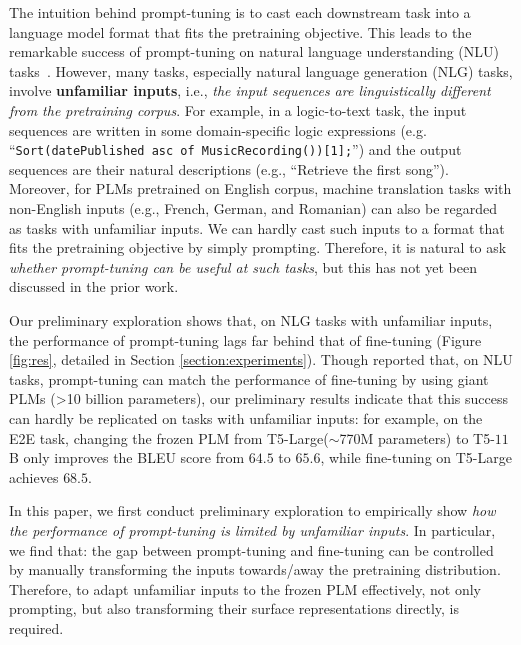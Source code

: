 The intuition behind prompt-tuning is to cast each downstream task into a language model format that fits the pretraining objective. This leads to the remarkable success of prompt-tuning on natural language understanding (NLU) tasks~\citep{liu2021gpt,lester2021power}. However, many tasks, especially natural language generation (NLG) tasks, involve \textbf{unfamiliar inputs}, i.e., \emph{the input sequences are linguistically different from the pretraining corpus}. For example, in a logic-to-text task, the input sequences are written in some domain-specific logic expressions (e.g. ``\texttt{\small Sort(datePublished asc of MusicRecording())[1];}'') and the output sequences are their natural descriptions (e.g., ``Retrieve the first song''). Moreover, for PLMs pretrained on English corpus, machine translation tasks with non-English inputs (e.g., French, German, and Romanian) can also be regarded as tasks with unfamiliar inputs. We can hardly cast such inputs to a format that fits the pretraining objective by simply prompting. Therefore, it is natural to ask \emph{whether prompt-tuning can be useful at such tasks}, but this has not yet been discussed in the prior work.

Our preliminary exploration shows that, on NLG tasks with unfamiliar inputs, the performance of prompt-tuning lags far behind that of fine-tuning (Figure \ref{fig:res}, detailed in Section \ref{section:experiments}).
Though \citet{lester2021power} reported that, on NLU tasks, prompt-tuning can match the performance of fine-tuning by using giant PLMs (\textgreater{10} billion parameters), our preliminary results indicate that this success can hardly be replicated on tasks with unfamiliar inputs: for example, on the E2E task, changing the frozen PLM from T5-Large($\sim$770M parameters) to T5-$11$B only improves the BLEU score from $64.5$ to $65.6$, while fine-tuning on T5-Large achieves $68.5$.

In this paper, we first conduct preliminary exploration to empirically show \emph{how the performance of prompt-tuning is limited by unfamiliar inputs}. In particular, we find that: the gap between prompt-tuning and fine-tuning can be controlled by manually transforming the inputs towards/away the pretraining distribution. Therefore, to adapt unfamiliar inputs to the frozen PLM effectively, not only prompting, but also transforming their surface representations directly, is required.

